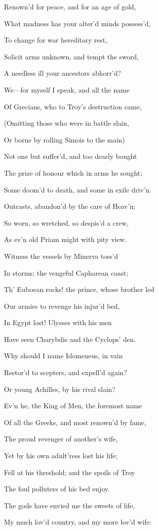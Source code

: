 Renown’d for peace, and for an age of gold,

What madness has your alter’d minds possess’d,

To change for war hereditary rest,

Solicit arms unknown, and tempt the sword,

A needless ill your ancestors abhorr’d?

We—for myself I speak, and all the name

Of Grecians, who to Troy’s destruction came,

(Omitting those who were in battle slain,

Or borne by rolling Simois to the main)

Not one but suffer’d, and too dearly bought

The prize of honour which in arms he sought;

Some doom’d to death, and some in exile driv’n.

Outcasts, abandon’d by the care of Heav’n;

So worn, so wretched, so despis’d a crew,

As ev’n old Priam might with pity view.

Witness the vessels by Minerva toss’d

In storms; the vengeful Capharean coast;

Th’ Euboean rocks! the prince, whose brother led

Our armies to revenge his injur’d bed,

In Egypt lost! Ulysses with his men

Have seen Charybdis and the Cyclops’ den.

Why should I name Idomeneus, in vain

Restor’d to scepters, and expell’d again?

Or young Achilles, by his rival slain?

Ev’n he, the King of Men, the foremost name

Of all the Greeks, and most renown’d by fame,

The proud revenger of another’s wife,

Yet by his own adult’ress lost his life;

Fell at his threshold; and the spoils of Troy

The foul polluters of his bed enjoy.

The gods have envied me the sweets of life,

My much lov’d country, and my more lov’d wife:


